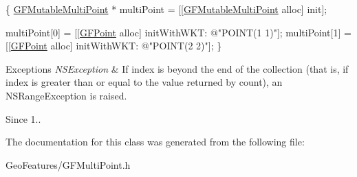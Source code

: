 \begin{DoxyCode}
\{
   \hyperlink{interface_g_f_mutable_multi_point}{GFMutableMultiPoint} * multiPoint = [[\hyperlink{interface_g_f_mutable_multi_point}{GFMutableMultiPoint} alloc] 
      init];

   multiPoint[0] = [[\hyperlink{interface_g_f_point}{GFPoint} alloc] initWithWKT: \textcolor{stringliteral}{@"POINT(1 1)"}];
   multiPoint[1] = [[\hyperlink{interface_g_f_point}{GFPoint} alloc] initWithWKT: \textcolor{stringliteral}{@"POINT(2 2)"}];
\}
\end{DoxyCode}



\begin{DoxyExceptions}{Exceptions}
{\em N\+S\+Exception} & If index is beyond the end of the collection (that is, if index is greater than or equal to the value returned by count), an N\+S\+Range\+Exception is raised.\\
\hline
\end{DoxyExceptions}
\begin{DoxySince}{Since}
1.. 
\end{DoxySince}


The documentation for this class was generated from the following file\+:\begin{DoxyCompactItemize}
\item 
Geo\+Features/G\+F\+Multi\+Point.\+h\end{DoxyCompactItemize}
